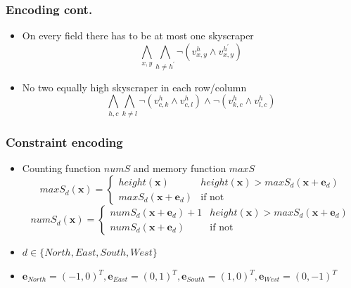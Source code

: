 \begin{frame}
	\frametitle{Encoding cont.}
	\begin{itemize}
		\item On every field there has to be at most one skyscraper
		\begin{displaymath}
			\bigwedge_{x,y} \bigwedge_{h\not=h^{\prime}} \neg(v_{x,y}^{h} \wedge v_{x,y}^{h^{\prime}})
		\end{displaymath}
		\item<2-> No two equally high skyscraper in each row/column
		\begin{displaymath}
			\bigwedge_{h,c} \bigwedge_{k\not=l} \neg(v_{c,k}^{h} \wedge v_{c,l}^{h}) \wedge \neg (v_{k,c}^{h} \wedge v_{l,c}^{h})
		\end{displaymath}
	\end{itemize}
\end{frame}

\begin{frame}
	\frametitle{Constraint encoding}
	\begin{itemize}
		\item Counting function $numS$ and memory function $maxS$
		\begin{displaymath}
			maxS_{d}(\pmb x) = 
			\begin{cases}
				height(\pmb x) & height(\pmb x) > maxS_{d}(\pmb x + \pmb e_{d})\\
				maxS_{d}(\pmb x + \pmb e_{d}) &\text{if not}
			\end{cases}
		\end{displaymath}
		\begin{displaymath}
			numS_{d}(\pmb x) =
			\begin{cases}
				numS_{d}(\pmb x + \pmb e_{d}) + 1 & height(\pmb x) > maxS_{d}(\pmb x + \pmb e_{d})\\
				numS_{d}(\pmb x + \pmb e_{d}) &\text{if not}
			\end{cases}
		\end{displaymath}
		\item $d\in \{North, East, South, West\}$
		\item $\pmb e_{North} = (-1,0)^T, \pmb e_{East} = (0,1)^T, \pmb e_{South} = (1,0)^T,\pmb e_{West} = (0,-1)^T$
	\end{itemize}
\end{frame}

